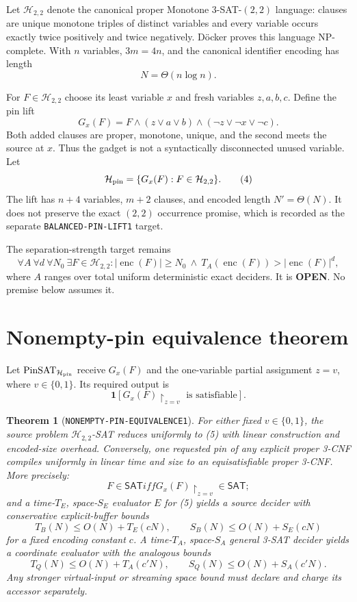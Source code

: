 \documentclass[11pt]{article}
\newtheorem{theorem}{Theorem}
\newcommand{\OPEN}{\textbf{OPEN}}
\begin{document}
Let $\mathcal H_{2,2}$ denote the canonical proper Monotone
$3$-SAT-$(2,2)$ language: clauses are unique monotone triples of distinct
variables and every variable occurs exactly twice positively and twice
negatively.  D\"ocker proves this language NP-complete.  With $n$ variables,
$3m=4n$, and the canonical identifier encoding has length
\[
 N=\Theta(n\log n).                                          \tag{2}
\]

For $F\in\mathcal H_{2,2}$ choose its least variable $x$ and fresh variables
$z,a,b,c$.  Define the pin lift
\[
 G_x(F)=F\wedge(z\vee a\vee b)
             \wedge(\neg z\vee\neg x\vee\neg c).            \tag{3}
\]
Both added clauses are proper, monotone, unique, and the second meets the
source at $x$.  Thus the gadget is not a syntactically disconnected unused
variable.  Let
\[
 \mathcal H_{\rm pin}=\{G_x(F):F\in\mathcal H_{2,2}\}.        \tag{4}
\]
The lift has $n+4$ variables, $m+2$ clauses, and encoded length $N'=\Theta(N)$.
It does not preserve the exact $(2,2)$ occurrence promise, which is recorded
as the separate \texttt{BALANCED-PIN-LIFT1} target.

The separation-strength target remains
\[
\tag{UCORE-TIME1}
\forall A\ \forall d\ \forall N_0\ \exists F\in\mathcal H_{2,2}:
 |\operatorname{enc}(F)|\ge N_0
 \ \wedge\ T_A(\operatorname{enc}(F))>|\operatorname{enc}(F)|^d,
\]
where $A$ ranges over total uniform deterministic exact deciders.  It is
\OPEN.  No premise below assumes it.

\section{Nonempty-pin equivalence theorem}

Let $\operatorname{PinSAT}_{\mathcal H_{\rm pin}}$ receive
$G_x(F)$ and the one-variable partial assignment $z=v$, where
$v\in\{0,1\}$.  Its required output is
\[
 \mathbf 1[G_x(F)\!\upharpoonright_{z=v}\text{ is satisfiable}]. \tag{5}
\]

\begin{theorem}[\texttt{NONEMPTY-PIN-EQUIVALENCE1}]
For either fixed $v\in\{0,1\}$, the source problem
$\mathcal H_{2,2}$-SAT reduces uniformly to (5) with linear construction and
encoded-size overhead.  Conversely, one requested pin of any explicit
proper 3-CNF compiles uniformly in linear time and size to an equisatisfiable
proper 3-CNF.  More precisely:
\[
 F\in\mathsf{SAT}iff
 G_x(F)\!\upharpoonright_{z=v}\in\mathsf{SAT};                \tag{6}
\]
and a time-$T_E$, space-$S_E$ evaluator $E$ for (5) yields a source decider
with conservative explicit-buffer bounds
\[
 T_B(N)\le O(N)+T_E(cN),\qquad S_B(N)\le O(N)+S_E(cN)         \tag{7}
\]
for a fixed encoding constant $c$.  A time-$T_A$, space-$S_A$ general
3-SAT decider yields a coordinate evaluator with the analogous bounds
\[
 T_Q(N)\le O(N)+T_A(c'N),\qquad S_Q(N)\le O(N)+S_A(c'N).      \tag{8}
\]
Any stronger virtual-input or streaming space bound must declare and charge
its accessor separately.
\end{theorem}
\end{document}
